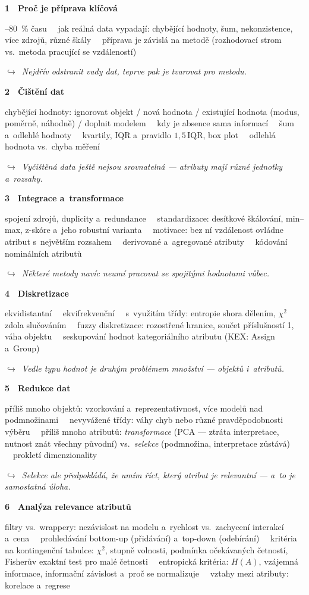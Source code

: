 \documentclass[11pt,a4paper]{article}
\newcommand{\tb}{\ \textcolor{defframe}{\textbullet}\ }
\newcommand{\blok}[2]{\par\addvspace{2.4mm}\noindent
  \textcolor{blokcol}{\textbf{#1}}\ \ \textbf{#2}\par\nobreak}
\newcommand{\tema}[1]{\par\nobreak\noindent #1\par}
\newcommand{\most}[1]{\par\nobreak\noindent
  {\small\itshape\textcolor{mostcol}{$\hookrightarrow$\ #1}}\par}
\begin{document}
\blok{1}{Proč je příprava klíčová}
\tema{60--80~\% času \tb jak reálná data vypadají: chybějící hodnoty, šum, nekonzistence,
více zdrojů, různé škály
\tb příprava je závislá na metodě (rozhodovací strom vs.\ metoda pracující se vzdáleností)}
\most{Nejdřív odstranit vady dat, teprve pak je tvarovat pro metodu.}

\blok{2}{Čištění dat}
\tema{chybějící hodnoty: ignorovat objekt / nová hodnota \uv{nevím} / existující hodnota
(modus, poměrně, náhodně) / doplnit modelem
\tb kdy je absence sama informací
\tb šum a~odlehlé hodnoty \tb kvartily, IQR a~pravidlo $1{,}5\,\mathrm{IQR}$, box plot
\tb odlehlá hodnota vs.\ chyba měření}
\most{Vyčištěná data ještě nejsou srovnatelná --- atributy mají různé jednotky a~rozsahy.}

\blok{3}{Integrace a~transformace}
\tema{spojení zdrojů, duplicity a~redundance
\tb standardizace: desítkové škálování, min--max, z-skóre a~jeho robustní varianta
\tb motivace: bez ní vzdálenost ovládne atribut s~největším rozsahem
\tb derivované a~agregované atributy \tb kódování nominálních atributů}
\most{Některé metody navíc neumí pracovat se spojitými hodnotami vůbec.}

\blok{4}{Diskretizace}
\tema{ekvidistantní \tb ekvifrekvenční
\tb s~využitím třídy: entropie shora dělením, $\chi^2$ zdola slučováním
\tb fuzzy diskretizace: rozostřené hranice, součet příslušností 1, váha objektu
\tb seskupování hodnot kategoriálního atributu (KEX: Assign a~Group)}
\most{Vedle typu hodnot je druhým problémem množství --- objektů i~atributů.}

\blok{5}{Redukce dat}
\tema{příliš mnoho objektů: vzorkování a~reprezentativnost, více modelů nad podmnožinami
\tb nevyvážené třídy: váhy chyb nebo různé pravděpodobnosti výběru
\tb příliš mnoho atributů: \emph{transformace} (PCA --- ztráta interpretace, nutnost znát
všechny původní) vs.\ \emph{selekce} (podmnožina, interpretace zůstává)
\tb prokletí dimenzionality}
\most{Selekce ale předpokládá, že umím říct, který atribut je relevantní --- a~to je
samostatná úloha.}

\blok{6}{Analýza relevance atributů}
\tema{filtry vs.\ wrappery: nezávislost na modelu a~rychlost vs.\ zachycení interakcí a~cena
\tb prohledávání bottom-up (přidávání) a~top-down (odebírání)
\tb kritéria na kontingenční tabulce: $\chi^2$, stupně volnosti, podmínka očekávaných
četností, Fisherův exaktní test pro malé četnosti
\tb entropická kritéria: $H(A)$, vzájemná informace, informační závislost a~proč se
normalizuje
\tb vztahy mezi atributy: korelace a~regrese}
\end{document}
